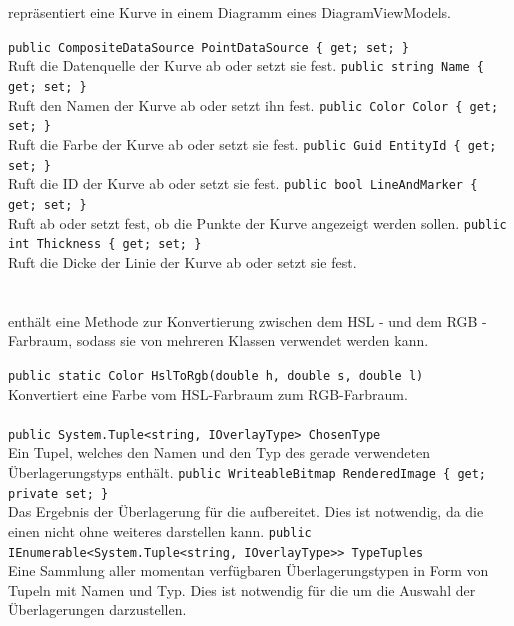 \paragraph{}~\\
 repräsentiert eine Kurve in einem Diagramm eines DiagramViewModels.
\begin{itemize}
	\add \verb!public CompositeDataSource PointDataSource { get; set; }! \\
	Ruft die Datenquelle der Kurve ab oder setzt sie fest.
	\add \verb!public string Name { get; set; }! \\
	Ruft den Namen der Kurve ab oder setzt ihn fest.
	\add \verb!public Color Color { get; set; }! \\
	Ruft die Farbe der Kurve ab oder setzt sie fest.
	\add \verb!public Guid EntityId { get; set; }! \\
	Ruft die ID der Kurve ab oder setzt sie fest.
	\add \verb!public bool LineAndMarker { get; set; }! \\
	Ruft ab oder setzt fest, ob die Punkte der Kurve angezeigt werden sollen.
	\add \verb!public int Thickness { get; set; }! \\
	Ruft die Dicke der Linie der Kurve ab oder setzt sie fest.
\end{itemize}

\paragraph{}~\\
 enthält eine Methode zur Konvertierung zwischen dem HSL - und dem RGB - Farbraum, sodass sie von mehreren Klassen verwendet werden kann.
\begin{itemize}
	\add \verb!public static Color HslToRgb(double h, double s, double l)! \\
	Konvertiert eine Farbe vom HSL-Farbraum zum RGB-Farbraum.
\end{itemize}

\paragraph{}
\begin{itemize}
	\add \verb!public System.Tuple<string, IOverlayType> ChosenType! \\
	Ein Tupel, welches den Namen und den Typ des gerade verwendeten Überlagerungstyps enthält.
	\add \verb!public WriteableBitmap RenderedImage { get; private set; }! \\
	Das Ergebnis der Überlagerung für die  aufbereitet. Dies ist notwendig, da die  einen  nicht ohne weiteres darstellen kann.
	\add \verb!public IEnumerable<System.Tuple<string, IOverlayType>> TypeTuples! \\
	Eine Sammlung aller momentan verfügbaren Überlagerungstypen in Form von Tupeln mit Namen und Typ. Dies ist notwendig für die  um die Auswahl der Überlagerungen darzustellen.
\end{itemize}
\newpage

